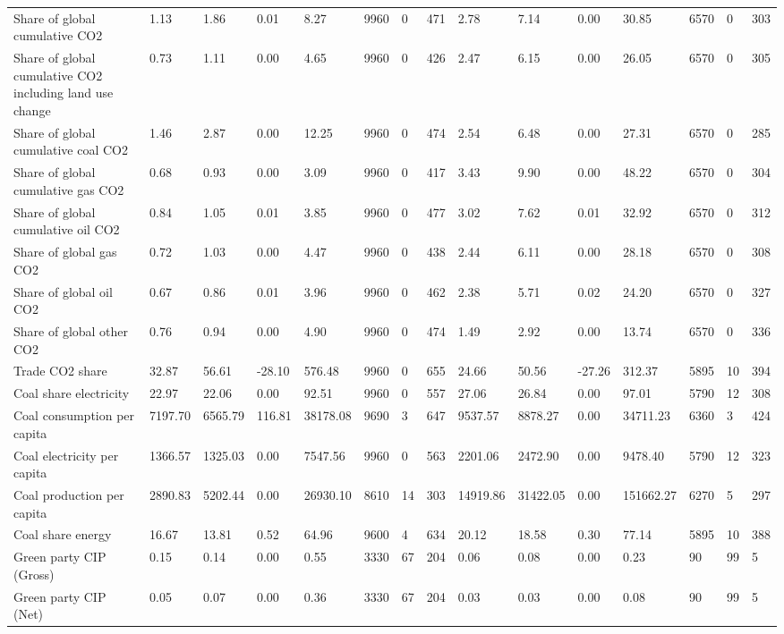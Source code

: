 \begin{longtable}{lllllllllllllll}
Share of global cumulative CO2 & 1.13 & 1.86 & 0.01 & 8.27 & 9960 & 0 & 471 & 2.78 & 7.14 & 0.00 & 30.85 & 6570 & 0 & 303\\
Share of global cumulative CO2 including land use change & 0.73 & 1.11 & 0.00 & 4.65 & 9960 & 0 & 426 & 2.47 & 6.15 & 0.00 & 26.05 & 6570 & 0 & 305\\
Share of global cumulative coal CO2 & 1.46 & 2.87 & 0.00 & 12.25 & 9960 & 0 & 474 & 2.54 & 6.48 & 0.00 & 27.31 & 6570 & 0 & 285\\
Share of global cumulative gas CO2 & 0.68 & 0.93 & 0.00 & 3.09 & 9960 & 0 & 417 & 3.43 & 9.90 & 0.00 & 48.22 & 6570 & 0 & 304\\
\addlinespace
Share of global cumulative oil CO2 & 0.84 & 1.05 & 0.01 & 3.85 & 9960 & 0 & 477 & 3.02 & 7.62 & 0.01 & 32.92 & 6570 & 0 & 312\\
Share of global gas CO2 & 0.72 & 1.03 & 0.00 & 4.47 & 9960 & 0 & 438 & 2.44 & 6.11 & 0.00 & 28.18 & 6570 & 0 & 308\\
Share of global oil CO2 & 0.67 & 0.86 & 0.01 & 3.96 & 9960 & 0 & 462 & 2.38 & 5.71 & 0.02 & 24.20 & 6570 & 0 & 327\\
Share of global other CO2 & 0.76 & 0.94 & 0.00 & 4.90 & 9960 & 0 & 474 & 1.49 & 2.92 & 0.00 & 13.74 & 6570 & 0 & 336\\
Trade CO2 share & 32.87 & 56.61 & -28.10 & 576.48 & 9960 & 0 & 655 & 24.66 & 50.56 & -27.26 & 312.37 & 5895 & 10 & 394\\
\addlinespace
Coal share electricity & 22.97 & 22.06 & 0.00 & 92.51 & 9960 & 0 & 557 & 27.06 & 26.84 & 0.00 & 97.01 & 5790 & 12 & 308\\
Coal consumption per capita & 7197.70 & 6565.79 & 116.81 & 38178.08 & 9690 & 3 & 647 & 9537.57 & 8878.27 & 0.00 & 34711.23 & 6360 & 3 & 424\\
Coal electricity per capita & 1366.57 & 1325.03 & 0.00 & 7547.56 & 9960 & 0 & 563 & 2201.06 & 2472.90 & 0.00 & 9478.40 & 5790 & 12 & 323\\
Coal production per capita & 2890.83 & 5202.44 & 0.00 & 26930.10 & 8610 & 14 & 303 & 14919.86 & 31422.05 & 0.00 & 151662.27 & 6270 & 5 & 297\\
Coal share energy & 16.67 & 13.81 & 0.52 & 64.96 & 9600 & 4 & 634 & 20.12 & 18.58 & 0.30 & 77.14 & 5895 & 10 & 388\\
\addlinespace
Green party CIP (Gross) & 0.15 & 0.14 & 0.00 & 0.55 & 3330 & 67 & 204 & 0.06 & 0.08 & 0.00 & 0.23 & 90 & 99 & 5\\
Green party CIP (Net) & 0.05 & 0.07 & 0.00 & 0.36 & 3330 & 67 & 204 & 0.03 & 0.03 & 0.00 & 0.08 & 90 & 99 & 5\\

\end{longtable}
